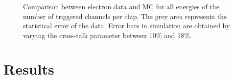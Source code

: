 \documentclass[twoside,a4paper,11pt]{article}
\begin{document}
\begin{figure}[htbp]
	\hfill
	\hfill
	\caption[]{Comparison between electron data and MC for all energies of the number of triggered channels per chip. The grey area represents the statistical error of the data. Error bars in simulation are obtained by varying the cross-talk parameter between 10\% and 18\%.}
	\label{fig:sim_data_elec_nHits}
\end{figure}

\section{Results}
\end{document}

